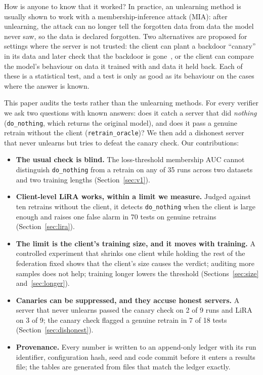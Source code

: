 \documentclass[11pt]{article}
\newcommand{\m}[1]{\texttt{#1}}
\newcommand{\dn}{\m{do\_nothing}}
\newcommand{\ro}{\m{retrain\_oracle}}
\begin{document}
How is anyone to know that it worked? In practice, an unlearning method is
usually shown to work with a membership-inference attack (MIA): after
unlearning, the attack can no longer tell the forgotten data from data the
model never saw, so the data is declared forgotten. Two alternatives are
proposed for settings where the server is not trusted: the client can plant a
backdoor ``canary'' in its data and later check that the backdoor is
gone~\cite{sommer2022}, or the client can compare the model's behaviour on data
it trained with and data it held back. Each of these is a statistical test, and
a test is only as good as its behaviour on the cases where the answer is known.

This paper audits the tests rather than the unlearning methods. For every
verifier we ask two questions with known answers: does it catch a server that
did \emph{nothing} (\dn, which returns the original model), and does it pass a
genuine retrain without the client (\ro)? We then add a dishonest server that
never unlearns but tries to defeat the canary check. Our contributions:

\begin{itemize}
\item \textbf{The usual check is blind.} The loss-threshold membership AUC
cannot distinguish \dn{} from a retrain on any of 35 runs across two datasets
and two training lengths (Section~\ref{sec:v1}).
\item \textbf{Client-level LiRA works, within a limit we measure.} Judged
against ten retrains without the client, it detects \dn{} when the client is
large enough and raises one false alarm in 70 tests on genuine retrains
(Section~\ref{sec:lira}).
\item \textbf{The limit is the client's training size, and it moves with
training.} A controlled experiment that shrinks one client while holding the
rest of the federation fixed shows that the client's size causes the verdict;
auditing more samples does not help; training longer lowers the threshold
(Sections~\ref{sec:size} and~\ref{sec:longer}).
\item \textbf{Canaries can be suppressed, and they accuse honest servers.} A
server that never unlearns passed the canary check on 2 of 9 runs and LiRA on
3 of 9; the canary check flagged a genuine retrain in 7 of 18 tests
(Section~\ref{sec:dishonest}).
\item \textbf{Provenance.} Every number is written to an append-only ledger
with its run identifier, configuration hash, seed and code commit before it
enters a results file; the tables are generated from files that match the
ledger exactly.
\end{itemize}
\end{document}
